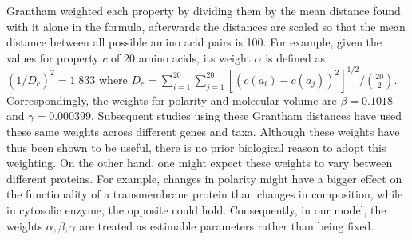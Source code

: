 Grantham weighted each property by dividing them by the mean distance found with it alone in the formula, afterwards the distances are scaled so that the mean distance between all possible amino acid pairs is 100.
For example, given the values for property $c$ of 20 amino acids, its weight $\alpha$ is defined as $(1/\bar{D}_c)^2 = 1.833$ where $\bar{D}_c = \sum_{i=1}^{20}  \sum_{j=1}^{20}[(c\left(a_i\right) - c\left(a_j\right))^2]^{1/2}/\binom{20}{2}$.
Correspondingly, the weights for polarity and molecular volume are $\beta = 0.1018$ and $\gamma = 0.000399$. 
Subsequent studies using these Grantham distances have used these same weights across different genes and taxa. 
Although these weights have thus been shown to be useful, there is no prior biological reason to adopt this weighting. 
On the other hand, one might expect these weights to vary between different proteins. 
For example, changes in polarity might have a bigger effect on the functionality of a transmembrane protein than changes in composition, while in cytosolic enzyme, the opposite could hold. 
Consequently, in our model, the weights $\alpha, \beta, \gamma$ are treated as estimable parameters rather than being fixed. 

